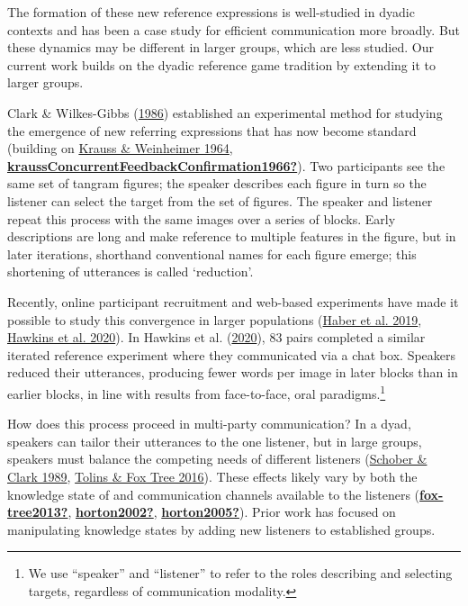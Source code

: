 \documentclass[
  english,
  a4paper,
]{article}
\begin{document}
The formation of these new reference expressions is well-studied in dyadic contexts and has been a case study for efficient communication more broadly. But these dynamics may be different in larger groups, which are less studied. Our current work builds on the dyadic reference game tradition by extending it to larger groups.

Clark \& Wilkes-Gibbs (\protect\hyperlink{ref-clarkReferringCollaborativeProcess1986}{1986}) established an experimental method for studying the emergence of new referring expressions that has now become standard (building on \protect\hyperlink{ref-kraussChangesReferencePhrases1964}{Krauss \& Weinheimer 1964}, \protect\hyperlink{ref-kraussConcurrentFeedbackConfirmation1966}{\textbf{kraussConcurrentFeedbackConfirmation1966?}}). Two participants see the same set of tangram figures; the speaker describes each figure in turn so the listener can select the target from the set of figures. The speaker and listener repeat this process with the same images over a series of blocks. Early descriptions are long and make reference to multiple features in the figure, but in later iterations, shorthand conventional names for each figure emerge; this shortening of utterances is called `reduction'.

Recently, online participant recruitment and web-based experiments have made it possible to study this convergence in larger populations (\protect\hyperlink{ref-haber2019}{Haber et al. 2019}, \protect\hyperlink{ref-hawkinsCharacterizingDynamicsLearning2020}{Hawkins et al. 2020}). In Hawkins et al. (\protect\hyperlink{ref-hawkinsCharacterizingDynamicsLearning2020}{2020}), 83 pairs completed a similar iterated reference experiment where they communicated via a chat box. Speakers reduced their utterances, producing fewer words per image in later blocks than in earlier blocks, in line with results from face-to-face, oral paradigms.\footnote{We use ``speaker'' and ``listener'' to refer to the roles describing and selecting targets, regardless of communication modality.}

How does this process proceed in multi-party communication? In a dyad, speakers can tailor their utterances to the one listener, but in large groups, speakers must balance the competing needs of different listeners (\protect\hyperlink{ref-schober1989}{Schober \& Clark 1989}, \protect\hyperlink{ref-tolins2016}{Tolins \& Fox Tree 2016}). These effects likely vary by both the knowledge state of and communication channels available to the listeners (\protect\hyperlink{ref-fox-tree2013}{\textbf{fox-tree2013?}}, \protect\hyperlink{ref-horton2002}{\textbf{horton2002?}}, \protect\hyperlink{ref-horton2005}{\textbf{horton2005?}}). Prior work has focused on manipulating knowledge states by adding new listeners to established groups.
\end{document}
